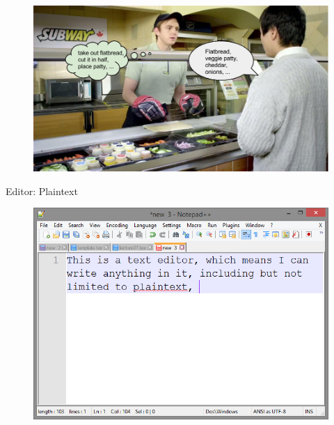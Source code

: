 \documentclass[xcolor={dvipsnames}]{beamer}
\newenvironment{changemargin}[2]{%
\begin{list}{}{%
\setlength{\topsep}{0pt}%
\setlength{\leftmargin}{#1}%
\setlength{\rightmargin}{#2}%
\setlength{\listparindent}{\parindent}%
\setlength{\itemindent}{\parindent}%
\setlength{\parsep}{\parskip}%
}%
\item[]}{\end{list}}
\begin{document}
\begin{frame}[plain]	
	\begin{changemargin}{-1cm}{+0cm}
		\begin{figure}
			\includegraphics[width=1.20\textwidth]{subway_editor_compiler}
		\end{figure}
	\end{changemargin}
\end{frame}

\begin{frame}{Editor: Plaintext}
	\begin{figure}
			\includegraphics[width=1\textwidth]{plaintext}
	\end{figure}
\end{frame}
\end{document}
